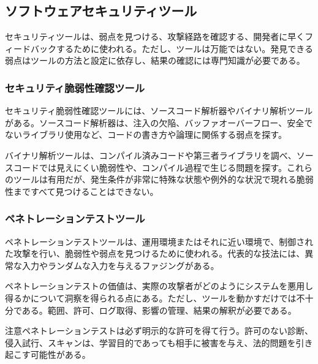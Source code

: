 \subsection{ソフトウェアセキュリティツール}
セキュリティツールは、弱点を見つける、攻撃経路を確認する、開発者に早くフィードバックするために使われる。ただし、ツールは万能ではない。発見できる弱点はツールの方法と設定に依存し、結果の確認には専門知識が必要である。

\subsubsection{セキュリティ脆弱性確認ツール}
セキュリティ脆弱性確認ツールには、ソースコード解析器やバイナリ解析ツールがある。ソースコード解析器は、注入の欠陥、バッファオーバーフロー、安全でないライブラリ使用など、コードの書き方や論理に関係する弱点を探す。

バイナリ解析ツールは、コンパイル済みコードや第三者ライブラリを調べ、ソースコードでは見えにくい脆弱性や、コンパイル過程で生じる問題を探す。これらのツールは有用だが、発生条件が非常に特殊な状態や例外的な状況で現れる脆弱性まですべて見つけることはできない。

\subsubsection{ペネトレーションテストツール}
ペネトレーションテストツールは、運用環境またはそれに近い環境で、制御された攻撃を行い、脆弱性や弱点を見つけるために使われる。代表的な技法には、異常な入力やランダムな入力を与えるファジングがある。

ペネトレーションテストの価値は、実際の攻撃者がどのようにシステムを悪用し得るかについて洞察を得られる点にある。ただし、ツールを動かすだけでは不十分である。範囲、許可、ログ取得、影響の管理、結果の解釈が必要である。

\begin{notebox}{注意}ペネトレーションテストは必ず明示的な許可を得て行う。許可のない診断、侵入試行、スキャンは、学習目的であっても相手に被害を与え、法的問題を引き起こす可能性がある。\end{notebox}
